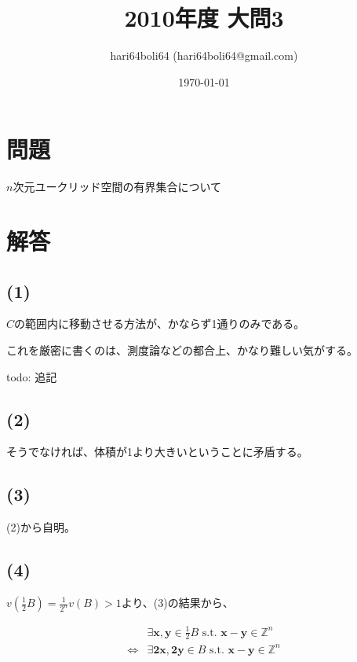 \documentclass[a4paper, 10pt, dvipdfmx]{jlreq}
\begin{document}
\title{2010年度 大問3}
\author{hari64boli64 (hari64boli64@gmail.com)}
\date{\today}
\maketitle

\section{問題}

$n$次元ユークリッド空間の有界集合について

\section{解答}

\subsection*{(1)}

$C$の範囲内に移動させる方法が、かならず1通りのみである。

これを厳密に書くのは、測度論などの都合上、かなり難しい気がする。

todo: 追記

\subsection*{(2)}

そうでなければ、体積が1より大きいということに矛盾する。

\subsection*{(3)}

(2)から自明。

\subsection*{(4)}

$v(\frac{1}{2}B)=\frac{1}{2^n}v(B) > 1$より、(3)の結果から、

\begin{align*}
                  & \exists \bm{x},\bm{y} \in \frac{1}{2}B \text{ s.t. } \bm{x}-\bm{y} \in \mathbb{Z}^n \\
  \Leftrightarrow & \exists \bm{2x},\bm{2y} \in B \text{ s.t. } \bm{x}-\bm{y} \in \mathbb{Z}^n          \\
\end{align*}
\end{document}

